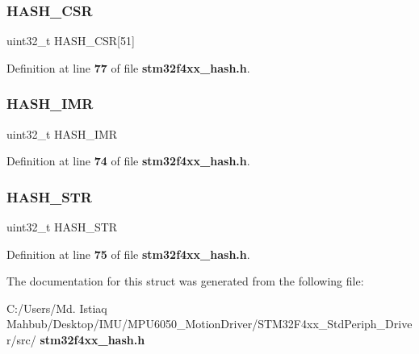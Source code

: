 \mbox{\label{structHASH__Context_ae434e78a21548d340e1b4ab71fe062cd}} 
\subsubsection{H\+A\+S\+H\+\_\+\+C\+SR}
{\footnotesize\ttfamily uint32\+\_\+t H\+A\+S\+H\+\_\+\+C\+SR[51]}



Definition at line \textbf{ 77} of file \textbf{ stm32f4xx\+\_\+hash.\+h}.

\mbox{\label{structHASH__Context_a1be47139d7d11eea10dd47ed78e8c60e}} 
\subsubsection{H\+A\+S\+H\+\_\+\+I\+MR}
{\footnotesize\ttfamily uint32\+\_\+t H\+A\+S\+H\+\_\+\+I\+MR}



Definition at line \textbf{ 74} of file \textbf{ stm32f4xx\+\_\+hash.\+h}.

\mbox{\label{structHASH__Context_ade129904b54583a02ee0baae5bed37f9}} 
\subsubsection{H\+A\+S\+H\+\_\+\+S\+TR}
{\footnotesize\ttfamily uint32\+\_\+t H\+A\+S\+H\+\_\+\+S\+TR}



Definition at line \textbf{ 75} of file \textbf{ stm32f4xx\+\_\+hash.\+h}.



The documentation for this struct was generated from the following file\+:\begin{DoxyCompactItemize}
\item 
C\+:/\+Users/\+Md. Istiaq Mahbub/\+Desktop/\+I\+M\+U/\+M\+P\+U6050\+\_\+\+Motion\+Driver/\+S\+T\+M32\+F4xx\+\_\+\+Std\+Periph\+\_\+\+Driver/src/\textbf{ stm32f4xx\+\_\+hash.\+h}\end{DoxyCompactItemize}
